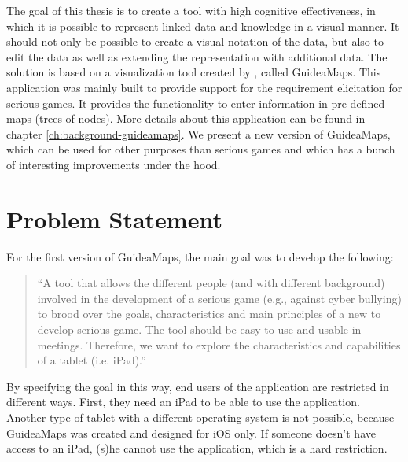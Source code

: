 The goal of this thesis is to create a tool with high cognitive effectiveness, in which it is possible to represent linked data and knowledge in a visual manner. It should not only be possible to create a visual notation of the data, but also to edit the data as well as extending the representation with additional data. The solution is based on a visualization tool created by \cite{erikjanssens}, called GuideaMaps. This application was mainly built to provide support for the requirement elicitation for serious games. It provides the functionality to enter information in pre-defined maps (trees of nodes). More details about this application can be found in chapter \ref{ch:background-guideamaps}. We present a new version of GuideaMaps, which can be used for other purposes than serious games and which has a bunch of interesting improvements under the hood.





\section{Problem Statement}\label{sec:problem-statement}
For the first version of GuideaMaps, the main goal was to develop the following:

\begin{quote}
``A tool that allows the different people (and with different background) involved in the development of a serious game (e.g., against cyber bullying) to brood over the goals, characteristics and main principles of a new to develop serious game. The tool should be easy to use and usable in meetings. Therefore, we want to explore the characteristics and capabilities of a tablet (i.e. iPad).'' \hfill \citep{erikjanssens}\\
\end{quote}

By specifying the goal in this way, end users of the application are restricted in different ways. First, they need an iPad to be able to use the application. Another type of tablet with a different operating system is not possible, because GuideaMaps was created and designed for iOS only. If someone doesn't have access to an iPad, (s)he cannot use the application, which is a hard restriction.\\

